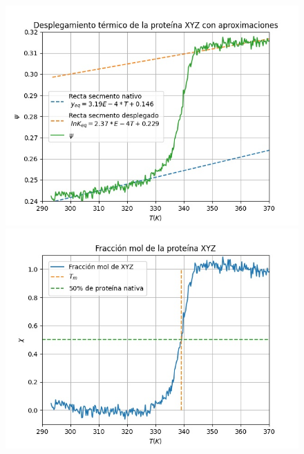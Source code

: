 \documentclass{article}
\begin{document}
    \begin{figure}[h!]
        \centering
        \begin{minipage}[b]{0.9\textwidth}
            \centering
          \includegraphics[scale=0.8]{g31.jpeg}
        \end{minipage}
        \begin{minipage}[b]{0.45\textwidth}
            \centering
          \includegraphics[scale=0.5]{g33.jpeg}
        \end{minipage}
        \begin{minipage}[b]{0.45\textwidth}
            \centering

\end{minipage}
\end{figure}
\end{document}
